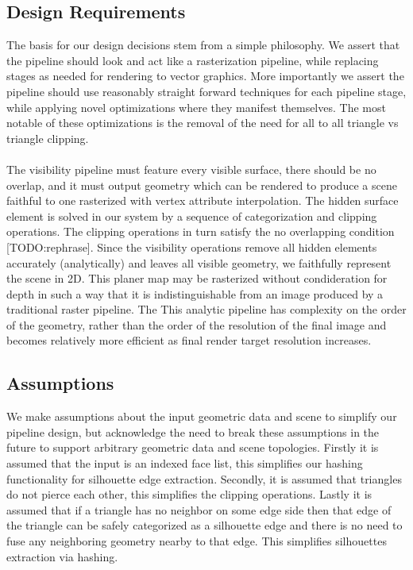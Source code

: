 \documentclass[review]{acmsiggraph}
\begin{document}
\subsection{Design Requirements}
The basis for our design decisions stem from a simple philosophy. We assert that the pipeline should look and act like a rasterization pipeline, while replacing stages as needed for rendering to vector graphics. More importantly we assert the pipeline should use reasonably straight forward techniques for each pipeline stage, while applying novel optimizations where they manifest themselves. The most notable of these optimizations is the removal of the need for all to all triangle vs triangle clipping.
\\\\
The visibility pipeline must feature every visible surface, there should be no overlap, and it must output geometry which can be rendered to produce a scene faithful to one rasterized with vertex attribute interpolation. The hidden surface element is solved in our system by a sequence of categorization and clipping operations. The clipping operations in turn satisfy the no overlapping condition [TODO:rephrase]. Since the visibility operations remove all hidden elements accurately (analytically) and leaves all visible geometry, we faithfully represent the scene in 2D. This planer map may be rasterized without condideration for depth in such a way that it is indistinguishable from an image produced by a traditional raster pipeline.  The This analytic pipeline has complexity on the order of the geometry, rather than the order of the resolution of the final image and becomes relatively more efficient as final render target resolution increases.

\subsection{Assumptions}
We make assumptions about the input geometric data and scene to simplify our pipeline design, but acknowledge the need to break these assumptions in the future to support arbitrary geometric data and scene topologies. Firstly it is assumed that the input is an indexed face list, this simplifies our hashing functionality for silhouette edge extraction. Secondly, it is assumed that triangles do not pierce each other, this simplifies the clipping operations. Lastly it is assumed that if a triangle has no neighbor on some edge side then that edge of the triangle can be safely categorized as a silhouette edge and there is no need to fuse any neighboring geometry nearby to that edge. This simplifies silhouettes extraction via hashing.
\end{document}
